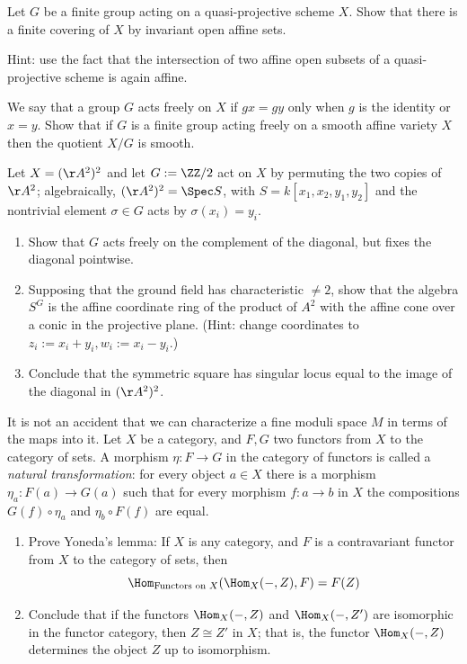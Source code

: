 \begin{exercise}\label{quotient of projective}
 Let $G$ be a finite group acting on a quasi-projective scheme $X$. Show that there is a finite covering of $X$ by invariant open affine sets.
 
 Hint: use the fact that the intersection of two affine open subsets of a quasi-projective scheme is again affine.
  \end{exercise}


\begin{exercise}\label{free actions}
We say that a group $G$ acts freely on $X$ if $gx = gy$ only when $g$ is the identity or $x=y$. Show that
 if $G$ is a finite group acting freely on a smooth affine variety $X$ then the quotient $X/G$ is smooth.
\end{exercise}


\begin{exercise}
 \label{sym2A2} 
 Let $X = (\AA^{2})^{2}$ and let $G := \ZZ/2$ act on $X$ by permuting the two copies of  $\AA^{2}$; algebraically,
$(\AA^{2})^{2} = \Spec S$, with $S = k[x_{1},x_{2}, y_{1}, y_{2}]$ and the nontrivial element $\sigma\in G$ acts by
$\sigma(x_{i}) = y_{i}$. 
 \begin{enumerate}
\item Show that $G$ acts freely on the complement of the diagonal, but fixes the diagonal pointwise.
\item Supposing that the ground field has characteristic $\neq 2$,
show that the algebra $S^{G}$ is the affine coordinate ring of the product
of $A^2$ with the affine cone over a conic in the projective plane. 
(Hint: change coordinates to $z_i := x_i+y_i, w_i := x_i - y_i$.)
\item Conclude that the symmetric square has singular locus equal to the image of the diagonal in 
$(\AA^{2})^{2}$.
\end{enumerate}
\end{exercise}

\begin{exercise}\label{Yoneda}
It is not an accident that we can characterize a fine moduli space $M$ in terms of the maps into it. 
 Let $X$ be a category, and $F,G$ two functors from $X$ to the category of sets.
 A morphism $\eta: F\to G$ in the category of functors is called a \emph{natural transformation}:
 for every object $a\in X$ there is a morphism $\eta_a:F(a) \to G(a)$ such that for every
 morphism $f: a\to b$ in $X$ the compositions $G(f)\circ \eta_a$ and $\eta_b\circ F(f)$
 are equal. 
\begin{enumerate}
 \item Prove Yoneda's lemma: If $X$ is any category, and $F$ is a contravariant functor from $X$ to the category of sets, then 
 $$
 \Hom_{\hbox{\scriptsize Functors on $X$}}(\Hom_X( -, Z), F) = F(Z)
 $$
 \item Conclude that if the functors $\Hom_X( -, Z)$ and $\Hom_X( -, Z')$ are isomorphic in the functor category, 
 then $Z \cong Z'$ in $X$; that is, the functor $\Hom_X( -, Z)$ determines the object $Z$ up to isomorphism.
 \end{enumerate}
\end{exercise}

